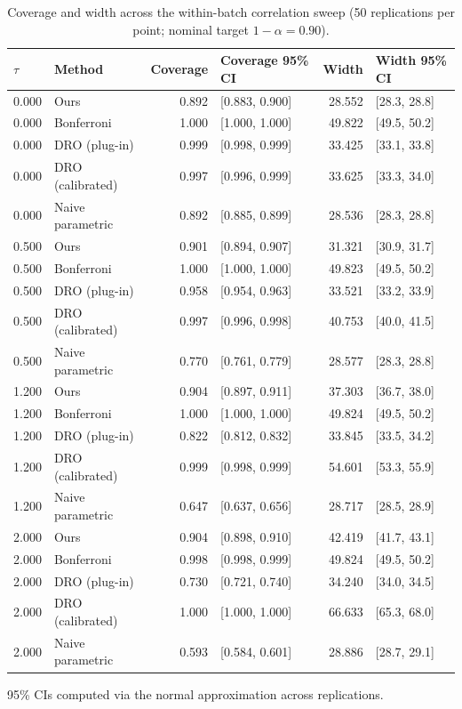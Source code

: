 \begin{table}[htbp]
\centering
\caption{Coverage and width across the within-batch correlation sweep (50 replications per point; nominal target $1-\alpha=0.90$).}
\label{tab:simulation-sweep}
\begin{tabular}{llrlrl}
\toprule
$\tau$ & Method & Coverage & Coverage 95\% CI & Width & Width 95\% CI \\
\midrule
0.000 & Ours & 0.892 & [0.883, 0.900] & 28.552 & [28.3, 28.8] \\
0.000 & Bonferroni & 1.000 & [1.000, 1.000] & 49.822 & [49.5, 50.2] \\
0.000 & DRO (plug-in) & 0.999 & [0.998, 0.999] & 33.425 & [33.1, 33.8] \\
0.000 & DRO (calibrated) & 0.997 & [0.996, 0.999] & 33.625 & [33.3, 34.0] \\
0.000 & Naive parametric & 0.892 & [0.885, 0.899] & 28.536 & [28.3, 28.8] \\
0.500 & Ours & 0.901 & [0.894, 0.907] & 31.321 & [30.9, 31.7] \\
0.500 & Bonferroni & 1.000 & [1.000, 1.000] & 49.823 & [49.5, 50.2] \\
0.500 & DRO (plug-in) & 0.958 & [0.954, 0.963] & 33.521 & [33.2, 33.9] \\
0.500 & DRO (calibrated) & 0.997 & [0.996, 0.998] & 40.753 & [40.0, 41.5] \\
0.500 & Naive parametric & 0.770 & [0.761, 0.779] & 28.577 & [28.3, 28.8] \\
1.200 & Ours & 0.904 & [0.897, 0.911] & 37.303 & [36.7, 38.0] \\
1.200 & Bonferroni & 1.000 & [1.000, 1.000] & 49.824 & [49.5, 50.2] \\
1.200 & DRO (plug-in) & 0.822 & [0.812, 0.832] & 33.845 & [33.5, 34.2] \\
1.200 & DRO (calibrated) & 0.999 & [0.998, 0.999] & 54.601 & [53.3, 55.9] \\
1.200 & Naive parametric & 0.647 & [0.637, 0.656] & 28.717 & [28.5, 28.9] \\
2.000 & Ours & 0.904 & [0.898, 0.910] & 42.419 & [41.7, 43.1] \\
2.000 & Bonferroni & 0.998 & [0.998, 0.999] & 49.824 & [49.5, 50.2] \\
2.000 & DRO (plug-in) & 0.730 & [0.721, 0.740] & 34.240 & [34.0, 34.5] \\
2.000 & DRO (calibrated) & 1.000 & [1.000, 1.000] & 66.633 & [65.3, 68.0] \\
2.000 & Naive parametric & 0.593 & [0.584, 0.601] & 28.886 & [28.7, 29.1] \\
\bottomrule
\end{tabular}
\begin{tablenotes}\small\item 95\% CIs computed via the normal approximation across replications.\end{tablenotes}
\end{table}
